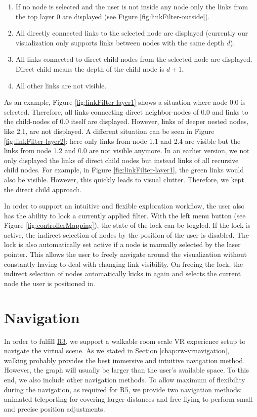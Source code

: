 \begin{enumerate}
    \item If no node is selected and the user is not inside any node only the links from the top layer 0 are displayed (see Figure \ref{fig:linkFilter-outside}).
    \item All directly connected links to the selected node are displayed (currently our visualization only supports links between nodes with the same depth $d$).
    \item All links connected to direct child nodes from the selected node are displayed. Direct child means the depth of the child node is $d+1$. 
    \item All other links are not visible.
\end{enumerate}

As an example, Figure \ref{fig:linkFilter-layer1} shows a situation where node 0.0 is selected. Therefore, all links connecting direct neighbor-nodes of 0.0 and links to the child-nodes of 0.0 itself are displayed. However, links of deeper nested nodes, like 2.1, are not displayed. 
A different situation can be seen in Figure \ref{fig:linkFilter-layer2}: here only links from node 1.1 and 2.4 are visible but the links from node 1.2 and 0.0 are not visible anymore.
In an earlier version, we not only displayed the links of direct child nodes but instead links of all recursive child nodes. For example, in Figure \ref{fig:linkFilter-layer1}, the green links would also be visible. However, this quickly leads to visual clutter. Therefore, we kept the direct child approach.

In order to support an intuitive and flexible exploration workflow, the user also has the ability to lock a currently applied filter.
With the left menu button (see Figure \ref{fig:controllerMapping}), the state of the lock can be toggled. 
If the lock is active, the indirect selection of nodes by the position of the user is disabled. The lock is also automatically set active if a node is manually selected by the laser pointer. 
This allows the user to freely navigate around the visualization without constantly having to deal with changing link visibility. 
On freeing the lock, the indirect selection of nodes automatically kicks in again and selects the current node the user is positioned in.

\section{Navigation}
\label{chap:solution-navigation}
In order to fulfill \hyperref[req:R3]{R3}, we support a walkable room scale VR experience setup to navigate the virtual scene. As we stated in Section \ref{chap:rw-vrnavigation}, walking probably provides the best immersive and intuitive navigation method.
However, the graph will usually be larger than the user's available space. To this end, we also include other navigation methods.
To allow maximum of flexibility during the navigation, as required for \hyperref[req:R5]{R5}, we provide two navigation methods: animated teleporting for covering larger distances and free flying to perform small and precise position adjustments.

